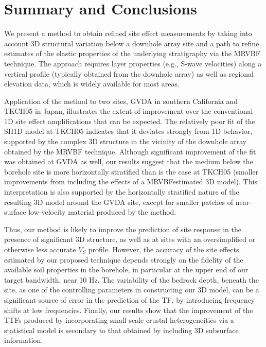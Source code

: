 {\section{Summary and Conclusions}\label{etf:conclusions}
We present a method to obtain refined site effect measurements by taking into account 3D structural variation below a downhole array site and a path to refine estimates of the elastic properties of the underlying stratigraphy via the MRVBF technique. The approach requires layer properties (e.g., S-wave velocities) along a vertical profile (typically obtained from the downhole array) as well as regional elevation data, which is widely available for most areas.

Application of the method to two sites, GVDA in southern California and TKCH05 in Japan, illustrates the extent of improvement over the conventional 1D site effect amplifications that can be expected. The relatively poor fit of the SH1D model at TKCH05 indicates that it deviates strongly from 1D behavior, supported by the complex 3D structure in the vicinity of the downhole array obtained by the MRVBF technique. Although significant improvement of the fit was obtained at GVDA as well, our results suggest that the medium below the borehole site is more horizontally stratified than is the case at TKCH05 (smaller improvements from including the effects of a MRVBFestimated 3D model). This interpretation is also supported by the horizontally stratified nature of the resulting 3D model around the GVDA site, except for smaller patches of near-surface low-velocity material produced by the method.

Thus, our method is likely to improve the prediction of site response in the presence of significant 3D structure, as well as at sites with an oversimplified or otherwise less accurate $V_S$ profile. However, the accuracy of the site effects estimated by our proposed technique depends strongly on the fidelity of the available soil properties in the borehole, in particular at the upper end of our target bandwidth, near 10 Hz. The variability of the bedrock depth, beneath the site, as one of the controlling parameters in constructing our 3D model, can be a significant source of error in the prediction of the TF, by introducing frequency shifts at low frequencies. Finally, our results show that the improvement of the TTFs produced by incorporating small-scale crustal heterogeneities via a statistical model is secondary to that obtained by including 3D subsurface information.

}

